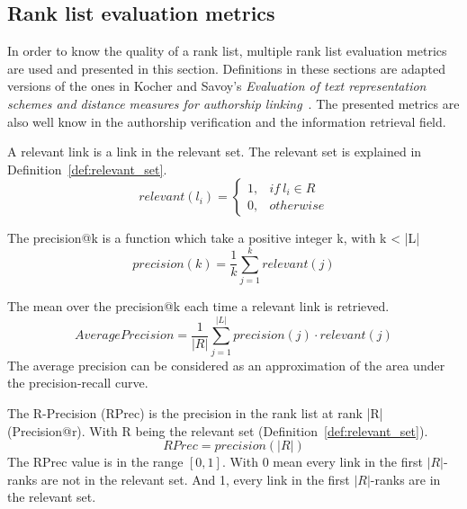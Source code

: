 \subsection{Rank list evaluation metrics \label{sec:rl_eval}}

In order to know the quality of a rank list, multiple rank list evaluation metrics are used and presented in this section.
Definitions in these sections are adapted versions of the ones in Kocher and Savoy's \textit{Evaluation of text representation schemes and distance measures for authorship linking}~\cite{kocher_linking}.
The presented metrics are also well know in the authorship verification and the information retrieval field.

\begin{definition}
  A relevant link is a link in the relevant set.
  The relevant set is explained in Definition~\ref{def:relevant_set}.
  \begin{equation}
    relevant(l_i) =
    \begin{cases}
      1, & if\ l_i \in R \\
      0, & otherwise
    \end{cases}
  \end{equation}
\end{definition}

\begin{definition}
  The precision@k is a function which take a positive integer k, with k < |L|
  \begin{equation}
    precision(k) = \frac{1}{k} \sum_{j=1}^{k} relevant(j)
  \end{equation}
\end{definition}

\begin{definition}
  The mean over the precision@k each time a relevant link is retrieved.
  \begin{equation}
    AveragePrecision = \frac{1}{|R|} \sum_{j=1}^{|L|} precision(j) \cdot relevant(j)
  \end{equation}
  The average precision can be considered as an approximation of the area under the precision-recall curve.
\end{definition}

\begin{definition}
  The R-Precision (RPrec) is the precision in the rank list at rank |R| (Precision@r).
  With R being the relevant set (Definition~\ref{def:relevant_set}).
  \begin{equation}
    RPrec = precision(|R|)
  \end{equation}
  The RPrec value is in the range $\left[0, 1\right]$.
  With 0 mean every link in the first $|R|$-ranks are not in the relevant set.
  And 1, every link in the first $|R|$-ranks are in the relevant set.
\end{definition}

